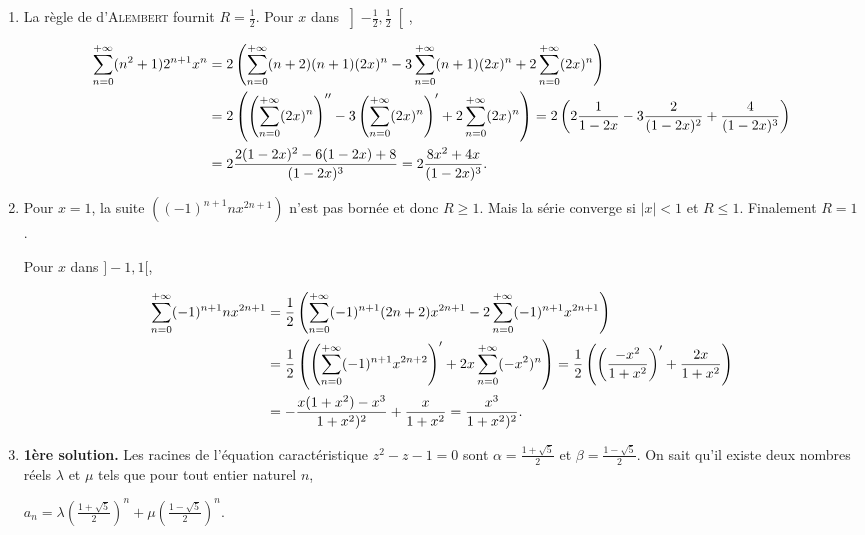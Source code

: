 {{\begin{enumerate}
\item  La règle de d'\textsc{Alembert} fournit $R=\frac{1}{2}$. Pour $x$ dans $\left]-\frac{1}{2},\frac{1}{2}\right[$,

\begin{align*}\ensuremath
\sum_{n=0}^{+\infty}(n^2+1)2^{n+1}x^n&=2\left(\sum_{n=0}^{+\infty}(n+2)(n+1)(2x)^n -3\sum_{n=0}^{+\infty}(n+1)(2x)^n +2\sum_{n=0}^{+\infty}(2x)^n\right)\\
  &= 2\left(\left(\sum_{n=0}^{+\infty}(2x)^n\right)''- 3\left(\sum_{n=0}^{+\infty}(2x)^n\right)'+2\sum_{n=0}^{+\infty}(2x)^n\right)
 = 2\left(2\frac{1}{1-2x}  - 3\frac{2}{(1-2x)^2}+\frac{4}{(1-2x)^3}\right)\\
 &=2\frac{2(1-2x)^2-6(1-2x)+8}{(1-2x)^3}=2\frac{8x^2+4x}{(1-2x)^3}.
\end{align*}

\item  Pour $x = 1$, la suite $((-1)^{n+1}nx^{2n+1})$ n'est pas bornée et donc $R\geqslant 1$. Mais la série converge si $|x| < 1$ et $R\leqslant 1$. Finalement $R=1$.

Pour $x$ dans $]-1,1[$,

\begin{align*}\ensuremath
\sum_{n=0}^{+\infty}(-1)^{n+1}nx^{2n+1}&=\frac{1}{2}\left(\sum_{n=0}^{+\infty}(-1)^{n+1}(2n+2)x^{2n+1}-2\sum_{n=0}^{+\infty}(-1)^{n+1}x^{2n+1}\right)\\ 
 &=\frac{1}{2}\left(\left(\sum_{n=0}^{+\infty}(-1)^{n+1}x^{2n+2}\right)'+2x\sum_{n=0}^{+\infty}(-x^2)^n\right)=\frac{1}{2}\left(\left(\frac{-x^2}{1+x^2}\right)'+\frac{2x}{1+x^2}\right)\\
 &= -\frac{x(1+x^2)-x^3}{1+x^2)^2}+\frac{x}{1+x^2}=\frac{x^3}{1+x^2)^2}.
\end{align*}

\begin{center}
\shadowbox{
$\forall x\in]-1,1[$, $\sum_{n=0}^{+\infty}(-1)^{n+1}nx^{2n+1}=\frac{x^3}{1+x^2)^2}$.
}
\end{center}

\item  \textbf{1ère solution.} Les racines de l'équation caractéristique $z^2 - z - 1 = 0$ sont $\alpha=\frac{1+\sqrt{5}}{2}$ et $\beta=\frac{1-\sqrt{5}}{2}$. On sait qu'il existe deux nombres réels $\lambda$ et $\mu$ tels que pour tout entier naturel $n$,

\begin{center}
$a_n =\lambda\left(\frac{1+\sqrt{5}}{2}\right)^n+\mu\left(\frac{1-\sqrt{5}}{2}\right)^n$.
\end{center}


\end{enumerate}}}

